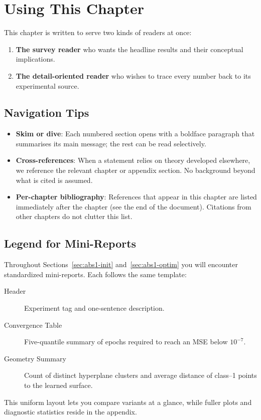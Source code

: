 ﻿%
\section{Using This Chapter}
\label{sec:abs1-using}

This chapter is written to serve two kinds of readers at once:

\begin{enumerate}
    \item \textbf{The survey reader} who wants the headline results and their
          conceptual implications.
    \item \textbf{The detail-oriented reader} who wishes to trace every number
          back to its experimental source.
\end{enumerate}

\subsection*{Navigation Tips}

\begin{itemize}
    \item \textbf{Skim or dive}: Each numbered section opens with a boldface
          paragraph that summarises its main message; the rest can be read
          selectively.
    \item \textbf{Cross-references}: When a statement relies on theory developed
          elsewhere, we reference the relevant chapter or appendix section.  No
          background beyond what is cited is assumed.
    \item \textbf{Per-chapter bibliography}: References that appear in this
          chapter are listed immediately after the chapter (see the end of the
          document).  Citations from other chapters do not clutter this list.
\end{itemize}

\subsection*{Legend for Mini-Reports}

Throughout Sections~\ref{sec:abs1-init} and~\ref{sec:abs1-optim} you will
encounter standardized mini-reports.  Each follows the same template:

\begin{description}
  \item[Header] Experiment tag and one-sentence description.
  \item[Convergence Table]   Five-quantile summary of epochs required to reach
        an MSE below \(10^{-7}\).
  \item[Geometry Summary]  Count of distinct hyperplane clusters and average
        distance of class--1 points to the learned surface.
\end{description}

This uniform layout lets you compare variants at a glance, while fuller plots
and diagnostic statistics reside in the appendix.

